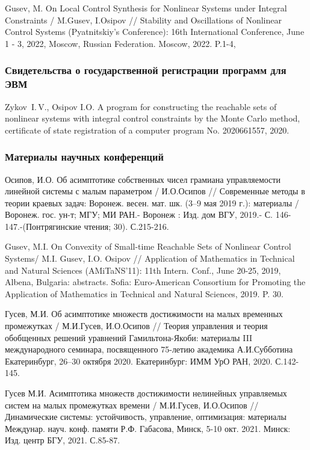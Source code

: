 \documentclass[../main.tex]{subfiles}
\begin{document}
\begin{thebibliography}{99}
Gusev, M. 
On Local Control Synthesis for Nonlinear Systems under Integral Constraints / 
M.Gusev, I.Osipov // 
Stability and Oscillations of Nonlinear Control Systems (Pyatnitskiy's Conference): 
16th International Conference, 
June 1 - 3, 2022, Moscow, Russian Federation. Moscow, 
2022. P.1-4, 
\subsubsection*{Свидетельства о государственной регистрации программ для ЭВМ}
Zykov~I.\,V., Osipov I.O. A program for constructing the reachable sets of nonlinear systems with integral control constraints by the Monte Carlo method, certificate of state registration of a computer program No. 2020661557, 2020.
\subsubsection*{Материалы научных конференций}

Осипов, И.О. Об асимптотике собственных чисел грамиана управляемости линейной системы с малым параметром / И.О.Осипов // Современные методы в теории краевых задач: Воронеж. весен. мат. шк. (3–9 мая 2019 г.): материалы / Воронеж. гос. ун-т; МГУ; МИ РАН.- Воронеж : Изд. дом ВГУ, 2019.- С. 146-147.-(Понтрягинские чтения; 30). С.215-216. 

Gusev, M.I. On Convexity of Small-time Reachable Sets of Nonlinear Control Systems/ M.I. Gusev, I.O. Osipov // Application of Mathematics in Technical and Natural Sciences (AMiTaNS’11): 11th Intern. Conf., June 20-25, 2019, Albena, Bulgaria: abstracts. Sofia: Euro-American Consortium for Promoting the Application of Mathematics in Technical and Natural Sciences, 2019. P. 30. 

Гусев, М.И. 
Об асимптотике множеств достижимости на малых временных промежутках / 
М.И.Гусев, И.О.Осипов // 
Теория управления и теория обобщенных решений уравнений Гамильтона-Якоби: материалы III международного семинара, посвященного 75-летию академика А.И.Субботина 
Екатеринбург, 26–30 октября 2020. 
Екатеринбург: ИММ УрО РАН, 2020. С.142-145.


Гусев М.И. Асимптотика множеств достижимости нелинейных управляемых систем на малых промежутках времени / М.И.Гусев, И.О.Осипов // Динамические системы: устойчивость, управление, оптимизация: материалы Междунар. науч. конф. памяти Р.Ф. Габасова, Минск, 5-10 окт. 2021. Минск: Изд. центр БГУ, 2021. С.85-87. 


\end{thebibliography}
\end{document}
